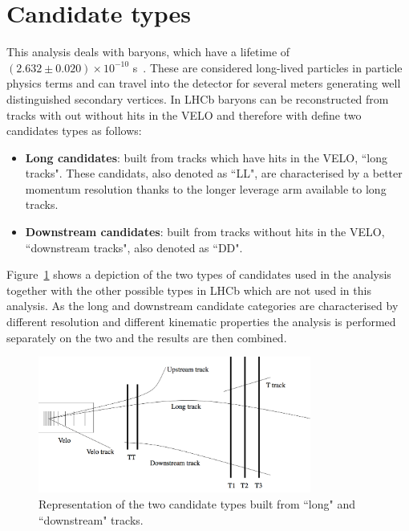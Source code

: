 \section{Candidate types}

This analysis deals with \Lz baryons, which have a lifetime of $(2.632 \pm 0.020 ) \times 10^{-10}$ s~\cite{PDG2014}.
These are considered long-lived particles in particle physics terms and can travel into the
detector for several meters generating well distinguished secondary vertices.
In LHCb \Lz baryons can be reconstructed from tracks with out without hits in the VELO and
therefore with define two candidates types as follows:

\begin{itemize}
\item {\bf Long candidates}: built from tracks which have hits in the VELO, ``long tracks".
These candidats, also denoted as ``LL", are characterised by a better momentum resolution
thanks to the longer leverage arm available to long tracks.
\item {\bf Downstream candidates}: built from tracks without hits in the VELO, ``downstream tracks", also denoted as ``DD".
\end{itemize}

Figure~\ref{fig:track_types} shows a depiction of the two types of candidates used in the analysis
together with the other possible types in LHCb which are not used in this analysis.
As the long and downstream candidate categories are characterised by different resolution and different
kinematic properties the analysis is performed separately on the two and the results are then combined.

\begin{figure}[hbt]
\centering
\includegraphics[width=0.8\textwidth,trim=0cm 0cm 0cm 5mm,]{Lmumu/figs/track_types.png}
\caption{Representation of the two \Lz candidate types built from ``long" and ``downstream" tracks.}
\label{fig:track_types}
\end{figure}
 
